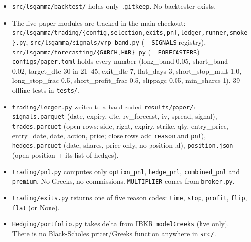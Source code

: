 \documentclass{article}
\begin{document}
\begin{itemize}

\item \texttt{src/\allowbreak{}lsgamma/\allowbreak{}backtest/\allowbreak{}} holds only \texttt{.\allowbreak{}gitkeep}. No backtester exists.

\item The live paper modules are tracked in the main checkout: \texttt{src/\allowbreak{}lsgamma/\allowbreak{}trading/\allowbreak{}\{config,\allowbreak{}selection,\allowbreak{}exits,\allowbreak{}pnl,\allowbreak{}ledger,\allowbreak{}runner,\allowbreak{}smoke\}.\allowbreak{}py}, \texttt{src/\allowbreak{}lsgamma/\allowbreak{}signals/\allowbreak{}vrp\_\allowbreak{}band.\allowbreak{}py} (+ \texttt{SIGNALS} registry), \texttt{src/\allowbreak{}lsgamma/\allowbreak{}forecasting/\allowbreak{}\{GARCH,\allowbreak{}HAR\}.\allowbreak{}py} (+ \texttt{FORECASTERS}). \texttt{configs/\allowbreak{}paper.\allowbreak{}toml} holds every number (long\_band 0.05, short\_band \ensuremath{-}0.02, target\_dte 30 in 21--45, exit\_dte 7, flat\_days 3, short\_stop\_mult 1.0, long\_stop\_frac 0.5, short\_profit\_frac 0.5, slippage 0.05, min\_shares 1). 39 offline tests in \texttt{tests/\allowbreak{}}.

\item \texttt{trading/\allowbreak{}ledger.\allowbreak{}py} writes to a hard-coded \texttt{results/\allowbreak{}paper/\allowbreak{}}: \texttt{signals.\allowbreak{}parquet} (date, expiry, dte, rv\_forecast, iv, spread, signal), \texttt{trades.\allowbreak{}parquet} (open rows: side, right, expiry, strike, qty, entry\_price, entry\_date, date, action, price; close rows add \texttt{reason} and \texttt{pnl}), \texttt{hedges.\allowbreak{}parquet} (date, shares, price only, no position id), \texttt{position.\allowbreak{}json} (open position + its list of hedges).

\item \texttt{trading/\allowbreak{}pnl.\allowbreak{}py} computes only \texttt{option\_\allowbreak{}pnl}, \texttt{hedge\_\allowbreak{}pnl}, \texttt{combined\_\allowbreak{}pnl} and \texttt{premium}. No Greeks, no commissions. \texttt{MULTIPLIER} comes from \texttt{broker.\allowbreak{}py}.

\item \texttt{trading/\allowbreak{}exits.\allowbreak{}py} returns one of five reason codes: \texttt{time}, \texttt{stop}, \texttt{profit}, \texttt{flip}, \texttt{flat} (or None).

\item \texttt{Hedging/\allowbreak{}portfolio.\allowbreak{}py} takes delta from IBKR \texttt{modelGreeks} (live only). There is no Black-Scholes pricer/\allowbreak{}Greeks function anywhere in \texttt{src/\allowbreak{}}.


\end{itemize}
\end{document}
